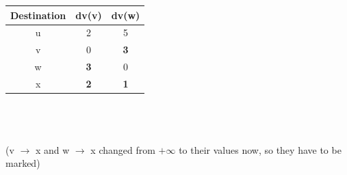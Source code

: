 \documentclass[12pt, a4paper]{article}
\begin{document}
    \begin{tabular}{||c c c||} 
     \hline
     Destination & dv(v) & dv(w) \\ [0.5ex] 
     \hline\hline
     u & 2 & 5 \\ 
     \hline
     v & 0 & \textbf{3} \\
     \hline
     w & \textbf{3} & 0 \\
     \hline
     x & \textbf{2} & \textbf{1} \\
     \hline
    \end{tabular} \\ \\ \\
(v \(\rightarrow\) x and w \(\rightarrow\) x changed from \(+\infty\) to their values now, so they have to be marked)
\end{document}
